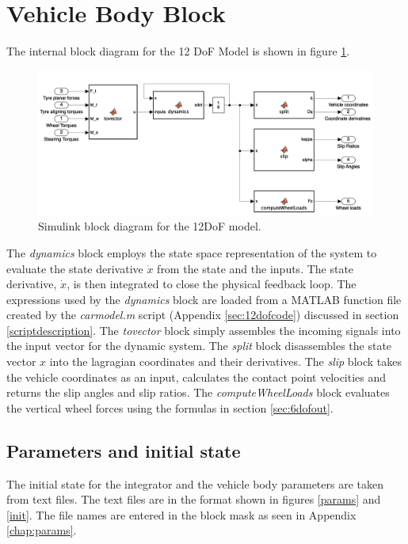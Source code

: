 \section{Vehicle Body Block}
\label{sec:bodyblock}
The internal block diagram for the 12 DoF Model is shown in figure \ref{12diag}.
\begin{figure}[ht]
    \centering
    \includegraphics[width=\textwidth]{images/12dofinside.png}
    \caption{Simulink block diagram for the 12DoF model.}
    \label{12diag}
\end{figure}
The \textit{dynamics} block employs the state space representation of the system to evaluate the state derivative $\dot x$ from the state and the inputs. The state derivative, $\dot x$, is then integrated to close the physical feedback loop. The expressions used by the \textit{dynamics} block are loaded from a MATLAB function file created by the \textit{carmodel.m} script (Appendix \ref{sec:12dofcode}) discussed in section \ref{scriptdescription}.
The \textit{tovector} block simply assembles the incoming signals into the input vector for the dynamic system. The \textit{split} block disassembles the state vector $x$ into the lagragian coordinates and their derivatives.
The \textit{slip} block takes the vehicle coordinates as an input, calculates the contact point velocities and returns the slip angles and slip ratios.
The \textit{computeWheelLoads} block evaluates the vertical wheel forces using the formulas in section \ref{sec:6dofout}.

\subsection{Parameters and initial state}
The initial state for the integrator and the vehicle body parameters are taken from text files. The text files are in the format shown in figures \ref{params} and \ref{init}.
The file names are entered in the block mask as seen in Appendix \ref{chap:params}.

